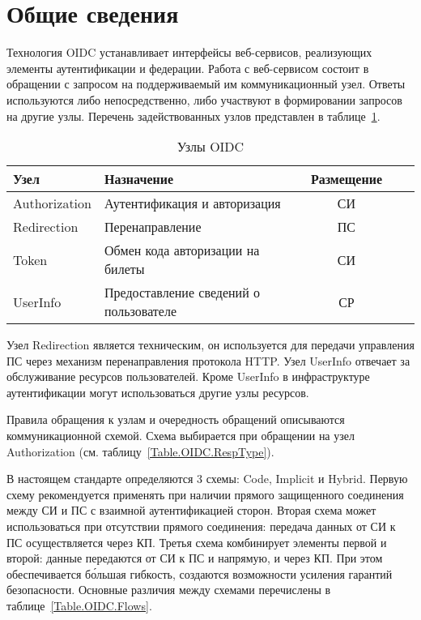 \section{Общие сведения}\label{OIDC.Prelim}

Технология OIDC устанавливает интерфейсы веб-сервисов, реализующих элементы 
аутентификации и федерации. 
%
Работа с веб-сервисом состоит в обращении с запросом на поддерживаемый им
коммуникационный узел. Ответы используются либо непосредственно, либо участвуют
в формировании запросов на другие узлы. Перечень задействованных узлов
представлен в таблице~\ref{Table.OIDC.Endpoints}.

\begin{table}[hbt]
\caption{Узлы OIDC}\label{Table.OIDC.Endpoints}
\begin{tabular}{|l|l|c|c|c|}
\hline
Узел & Назначение & Размещение\\
\hline
\hline
Authorization & Аутентификация и авторизация & СИ\\
%
Redirection & Перенаправление & ПС\\
%
Token & Обмен кода авторизации на билеты & СИ\\
%
UserInfo & Предоставление сведений о пользователе & СР\\
\hline
\end{tabular}
\end{table}

Узел Redirection является техническим, он используется
для передачи управления ПС через механизм перенаправления протокола HTTP.
%
Узел UserInfo отвечает за обслуживание ресурсов 
пользователей. Кроме UserInfo в инфраструктуре аутентификации могут 
использоваться другие узлы ресурсов.

Правила обращения к узлам и очередность обращений описываются 
коммуникационной схемой. Схема выбирается при обращении на узел 
Authorization (см. таблицу~\ref{Table.OIDC.RespType}).

В настоящем стандарте определяются 3 схемы: Code, Implicit и Hybrid. 
%
Первую схему рекомендуется применять при наличии прямого защищенного 
соединения между СИ и ПС с взаимной аутентификацией сторон.
% 
%
Вторая схема может использоваться при отсутствии прямого соединения:
передача данных от СИ к ПС осуществляется через КП.
%
%
Третья схема комбинирует элементы первой и второй: данные 
передаются от СИ к ПС и напрямую, и через КП. При этом обеспечивается 
б\'{о}льшая гибкость, создаются возможности усиления гарантий безопасности.
%
Основные различия между схемами перечислены в таблице~\ref{Table.OIDC.Flows}.

